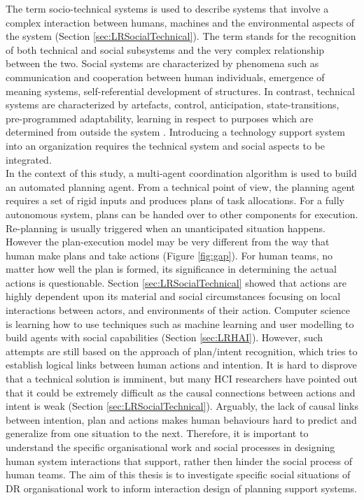 The term socio-technical systems is used to describe systems that involve a complex interaction between humans, machines and the environmental aspects of the system (Section \ref{sec:LRSocialTechnical}). The term stands for the recognition of both technical and social subsystems and the very complex relationship between the two. Social systems are characterized by phenomena such as communication and cooperation between human individuals, emergence of meaning systems, self-referential development of structures. In contrast, technical systems are characterized by artefacts, control, anticipation, state-transitions, pre-programmed adaptability, learning in respect to purposes which are determined from outside the system \citep{Ropohl1999}. Introducing a technology support system into an organization requires the technical system and social aspects to be integrated.\\

In the context of this study, a multi-agent coordination algorithm is used to build an automated planning agent. From a technical point of view,  the planning agent requires a set of rigid inputs and produces plans of task allocations. For a fully autonomous system, plans can be handed over to other components for execution. Re-planning is usually triggered when an unanticipated situation happens. However the plan-execution model may be very different from the way that human make plans and take actions (Figure \ref{fig:gap}). For human teams, no matter how well the plan is formed, its significance in determining the actual actions is questionable. Section \ref{sec:LRSocialTechnical} showed that actions are highly dependent upon its material and social circumstances focusing on local interactions between actors, and environments of their action. Computer science is learning how to use techniques such as machine learning and user modelling to build agents with social capabilities (Section \ref{sec:LRHAI}). However, such attempts are still based on the approach of plan/intent recognition, which tries to establish logical links between human actions and intention.  It is hard to disprove that a technical solution is imminent, but many \ac{HCI} researchers have pointed out that it could be extremely difficult as the causal connections between actions and intent is weak (Section \ref{sec:LRSocialTechnical}). Arguably, the lack of causal links between intention, plan and actions makes human behaviours hard to predict and generalize from one situation to the next. Therefore, it is important to understand the specific organisational work and social processes in designing human system interactions that support, rather then hinder the social process of human teams. The aim of this thesis is to investigate specific social situations of \ac{DR} organisational work to inform interaction design of planning support systems. \\

